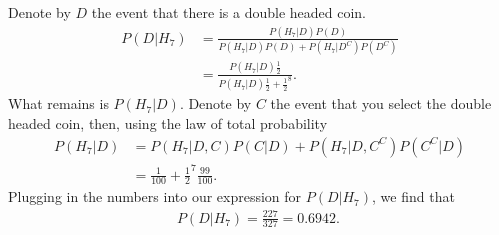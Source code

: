 

\setcounter{theorem}{6}

\begin{exercise} [BH.2.7] 
	\begin{solution}
	 	Denote by $D$ the event that there is a double headed coin. 
	\begin{align*}
		P(D|H_{7})& = \frac{P(H_{7}|D)P(D)}{P(H_{7}|D)P(D) + P(H_{7}|D^{C})P(D^{C})}\\
		&=\frac{P(H_{7}|D)\frac{1}{2}}{P(H_{7}|D)\frac{1}{2} + \frac{1}{2}^8}.
	\end{align*}
	What remains is $P(H_{7}|D)$. Denote by $C$ the event that you select the double headed coin, then, using the law of total probability
	\begin{align*}
		P(H_{7}|D) &=P(H_{7}|D,C)P(C|D) + P(H_{7}|D,C^{C})P(C^{C}|D)\\
		& = \frac{1}{100} + \frac{1}{2}^7\frac{99}{100}.
	\end{align*}
	Plugging in the numbers into our expression for $P(D|H_{7})$, we find that
	\begin{align*}
		P(D|H_{7}) = \frac{227}{327} = 0.6942.\
	\end{align*}
\end{solution}
\end{exercise}


